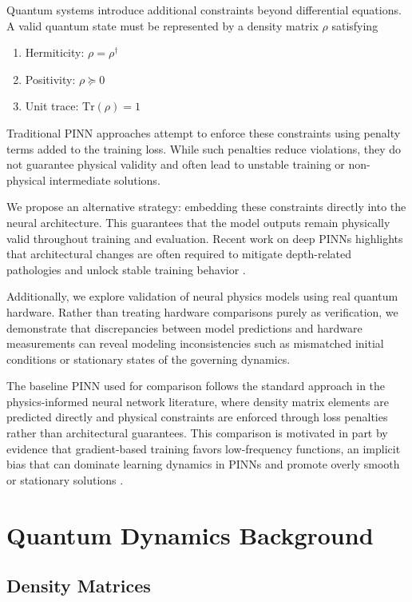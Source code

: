 \documentclass[11pt]{article}
\begin{document}
Quantum systems introduce additional constraints beyond differential equations.
A valid quantum state must be represented by a density matrix $\rho$ satisfying

\begin{enumerate}
\item Hermiticity: $\rho = \rho^\dagger$
\item Positivity: $\rho \succeq 0$
\item Unit trace: $\mathrm{Tr}(\rho) = 1$
\end{enumerate}

Traditional PINN approaches attempt to enforce these constraints using penalty terms added to the training loss.
While such penalties reduce violations, they do not guarantee physical validity and often lead to unstable training or non-physical intermediate solutions.

We propose an alternative strategy: embedding these constraints directly into the neural architecture.
This guarantees that the model outputs remain physically valid throughout training and evaluation.
Recent work on deep PINNs highlights that architectural changes are often required to mitigate depth-related pathologies and unlock stable training behavior \cite{jiang2025deeperpinns}.

Additionally, we explore validation of neural physics models using real quantum hardware.
Rather than treating hardware comparisons purely as verification, we demonstrate that discrepancies between model predictions and hardware measurements can reveal modeling inconsistencies such as mismatched initial conditions or stationary states of the governing dynamics.

The baseline PINN used for comparison follows the standard approach in the physics-informed neural network literature, where density matrix elements are predicted directly and physical constraints are enforced through loss penalties rather than architectural guarantees.
This comparison is motivated in part by evidence that gradient-based training favors low-frequency functions, an implicit bias that can dominate learning dynamics in PINNs and promote overly smooth or stationary solutions \cite{rahaman2019,xu2018,arpit2017,neyshabur2014,zhang2017}.

\section{Quantum Dynamics Background}

\subsection{Density Matrices}
\end{document}
